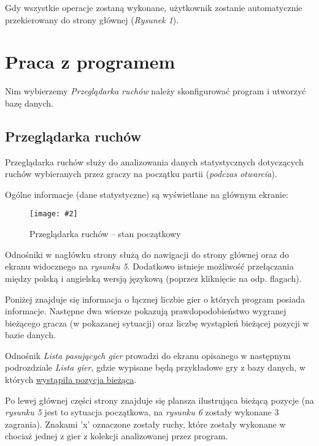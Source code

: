 \documentclass[10pt,leqno]{article}
\newcommand{\myimage}[3]{
  \begin{figure}[h!]
    \centering
      \texttt{[image: \#2]}
  \caption{#3}
  \end{figure}
}
\begin{document}
Gdy wszystkie operacje zostaną wykonane, użytkownik zostanie automatycznie przekierowany do strony głównej (\emph{Rysunek 1}).

\newpage

\section{Praca z programem}
Nim wybierzemy \emph{Przeglądarka ruchów} należy skonfigurować program i utworzyć bazę danych.

\subsection{Przeglądarka ruchów}

Przeglądarka ruchów służy do analizowania danych statystycznych dotyczących ruchów 
wybieranych przez graczy na początku partii (\emph{podczas otwarcia}).

Ogólne informacje (dane statystyczne) są wyświetlane na głównym ekranie:

\myimage{0.47}{moveBrowserMain.png}{Przeglądarka ruchów -- stan początkowy}

\noindent Odnośniki w nagłówku strony służą do nawigacji do strony głównej oraz do ekranu widocznego na \emph{rysunku 5}. 
Dodatkowo istnieje możliwość przełączania między polską i angielską wersją językową (poprzez kliknięcie na odp. flagach).

\vspace{0.5em}

\noindent Poniżej znajduje się informacja o łącznej liczbie gier o których program posiada informacje. Następne dwa wiersze pokazują
prawdopodobieństwo wygranej bieżącego gracza (w pokazanej sytuacji) oraz liczbę wystąpień bieżącej pozycji w bazie danych.

\vspace{0.5em}

\noindent Odnośnik \emph{Lista pasujących gier} prowadzi do ekranu opisanego w następnym podrozdziale \emph{Lista gier}, gdzie wypisane będą
przykładowe gry z bazy danych, w których \underline{wystąpiła pozycja bieżąca}.

\vspace{0.5em}

\noindent Po lewej głównej części strony znajduje się plansza ilustrująca bieżącą pozycje (na \emph{rysunku 5} jest to sytuacja początkowa, 
na \emph{rysunku 6} zostały wykonane 3 zagrania). Znakami 'x' oznaczone zostały ruchy, które zostały wykonane w chociaż jednej z
gier z kolekcji analizowanej przez program. 
\end{document}
